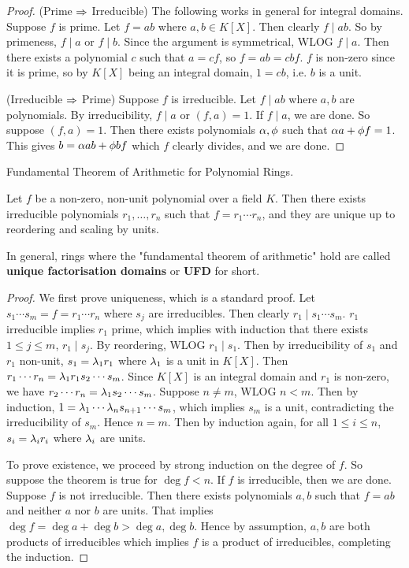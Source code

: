 \documentclass[../book.tex]{subfiles}
\begin{document}
\begin{proof}
    (Prime $\Rightarrow$ Irreducible)
    The following works in general for integral domains. 
    Suppose $f$ is prime. Let $f = ab$ where $a, b \in K[X]$. 
    Then clearly $f \mid ab$. 
    So by primeness, $f \mid a$ or $f \mid b$. 
    Since the argument is symmetrical, WLOG $f \mid a$. 
    Then there exists a polynomial $c$ such that $a = cf$,
    so $f = ab = cbf$. 
    $f$ is non-zero since it is prime, so by $K[X]$ being an integral domain,
    $1 = cb$, i.e. $b$ is a unit. 
    
    (Irreducible $\Rightarrow$ Prime)
    Suppose $f$ is irreducible. Let $f \mid ab$ where $a, b$ are polynomials. 
    By irreducibility, $f \mid a$ or $(f, a) = 1$.
    If $f \mid a$, we are done. 
    So suppose $(f, a) = 1$. 
    Then there exists polynomials $\alpha, \phi$ such that $\alpha a + \phi f = 1$.
    This gives $b = \alpha a b + \phi b f$ which $f$ clearly divides, and we are done.
\end{proof}
\begin{thm} Fundamental Theorem of Arithmetic for Polynomial Rings.
    
    Let $f$ be a non-zero, non-unit polynomial over a field $K$.
    Then there exists irreducible polynomials $r_1, \dots, r_n$ such that
    $f = r_1\cdots r_n$, and they are unique up to reordering and scaling by units.
    
    In general, rings where the "fundamental theorem of arithmetic" hold
    are called \textbf{unique factorisation domains} or \textbf{UFD} for short.
\end{thm}
\begin{proof}
    We first prove uniqueness, which is a standard proof.
    Let $s_1 \cdots s_m = f = r_1 \cdots r_n$ where $s_j$ are irreducibles.
    Then clearly $r_1 \mid s_1 \cdots s_m$. 
    $r_1$ irreducible implies $r_1$ prime, which implies with induction that
    there exists $1 \leq j \leq m$, $r_1 \mid s_j$. 
    By reordering, WLOG $r_1 \mid s_1$. 
    Then by irreducibility of $s_1$ and $r_1$ non-unit, 
    $s_1 = \lambda_1 r_1$ where $\lambda_1$ is a unit in $K[X]$. 
    Then $r_1 \cdots r_n = \lambda_1 r_1 s_2 \cdots s_m$. 
    Since $K[X]$ is an integral domain and $r_1$ is non-zero, 
    we have $r_2 \cdots r_n = \lambda_1 s_2 \cdots s_m$. 
    Suppose $n \neq m$, WLOG $n < m$. 
    Then by induction, $1 = \lambda_1 \cdots \lambda_n s_{n+1} \cdots s_m$,
    which implies $s_m$ is a unit, contradicting the irreducibility of $s_m$.
    Hence $n = m$. Then by induction again, for all $1\leq i \leq n$,
    $s_i = \lambda_i r_i$ where $\lambda_i$ are units. 
    
    To prove existence, we proceed by strong induction on the degree of $f$. 
    So suppose the theorem is true for $\deg f < n$. 
    If $f$ is irreducible, then we are done. 
    Suppose $f$ is not irreducible. 
    Then there exists polynomials $a, b$ such that $f = ab$ and 
    neither $a$ nor $b$ are units. 
    That implies $\deg f = \deg a + \deg b > \deg a, \deg b$. 
    Hence by assumption, $a, b$ are both products of irreducibles
    which implies $f$ is a product of irreducibles, completing the induction. 
\end{proof}
\end{document}
